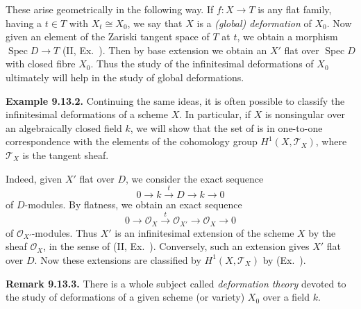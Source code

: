 {These arise geometrically in the following way. If $f\colon X\to T$ is any flat family, having a  $t\in T$ with $X_t\cong X_0$, we say that $X$ is a \emph{(global) deformation} of $X_0$. Now given an element of the Zariski tangent space of $T$ at $t$, we obtain a morphism $\operatorname{Spec} D\to T$ (II, Ex.~). Then by base extension we obtain an $X'$ flat over $\operatorname{Spec} D$ with closed fibre $X_0$. Thus the study of the infinitesimal deformations of $X_0$ ultimately will help in the study of global deformations.

\medskip
\noindent\hypertarget{result-III-9.13.2}{}\textbf{Example 9.13.2.} Continuing the same ideas, it is often possible to classify the infinitesimal deformations of a scheme $X$. In particular, if $X$ is nonsingular over an algebraically closed field $k$, we will show that the set of  is in one-to-one correspondence with the elements of the cohomology group $H^1(X,\mathcal T_X)$, where $\mathcal T_X$ is the tangent sheaf.

Indeed, given $X'$ flat over $D$, we consider the exact sequence
\[
0\longrightarrow k\xrightarrow{t}D\longrightarrow k\longrightarrow0
\]
of $D$-modules. By flatness, we obtain an exact sequence
\[
0\longrightarrow\mathcal O_X\xrightarrow{t}\mathcal O_{X'}\longrightarrow\mathcal O_X\longrightarrow0
\]
of $\mathcal O_{X'}$-modules. Thus $X'$ is an infinitesimal extension of the scheme $X$ by the sheaf $\mathcal O_X$, in the sense of (II, Ex.~). Conversely, such an extension gives $X'$ flat over $D$. Now these extensions are classified by $H^1(X,\mathcal T_X)$ by (Ex.~).

\medskip
\noindent\hypertarget{result-III-9.13.3}{}\textbf{Remark 9.13.3.} There is a whole subject called \emph{deformation theory} devoted to the study of deformations of a given scheme (or variety) $X_0$ over a field $k$.}
